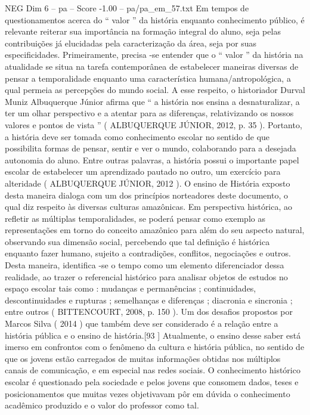 \begin{textsample}{NEG Dim 6 – pa – Score -1.00 – pa/pa\_em\_57.txt}
Em tempos de questionamentos acerca do “ valor ” da história enquanto conhecimento público, é relevante reiterar sua importância na formação integral do aluno, seja pelas contribuições já elucidadas pela caracterização da área, seja por suas especificidades.
Primeiramente, precisa -se entender que o “ valor ” da história na atualidade se situa na tarefa contemporânea de estabelecer maneiras diversas de pensar a temporalidade enquanto uma característica humana/antropológica, a qual permeia as percepções do mundo social.
A esse respeito, o historiador Durval Muniz Albuquerque Júnior afirma que “ a história nos ensina a desnaturalizar, a ter um olhar perspectivo e a atentar para as diferenças, relativizando os nossos valores e pontos de vista ” ( ALBUQUERQUE JÚNIOR, 2012, p. 35 ).
Portanto, a história deve ser tomada como conhecimento escolar no sentido de que possibilita formas de pensar, sentir e ver o mundo, colaborando para a desejada autonomia do aluno.
Entre outras palavras, a história possui o importante papel escolar de estabelecer um aprendizado pautado no outro, um exercício para alteridade ( ALBUQUERQUE JÚNIOR, 2012 ).
O ensino de História exposto desta maneira dialoga com um dos princípios norteadores deste documento, o qual diz respeito às diversas culturas amazônicas.
Em perspectiva histórica, ao refletir as múltiplas temporalidades, se poderá pensar como exemplo as representações em torno do conceito amazônico para além do seu aspecto natural, observando sua dimensão social, percebendo que tal definição é histórica enquanto fazer humano, sujeito a contradições, conflitos, negociações e outros.
Desta maneira, identifica -se o tempo como um elemento diferenciador dessa realidade, ao trazer o referencial histórico para analisar objetos de estudos no espaço escolar tais como : mudanças e permanências ; continuidades, descontinuidades e rupturas ; semelhanças e diferenças ; diacronia e sincronia ; entre outros ( BITTENCOURT, 2008, p. 150 ).
Um dos desafios propostos por Marcos Silva ( 2014 ) que também deve ser considerado é a relação entre a história pública e o ensino de história.[93 ] Atualmente, o ensino desse saber está imerso em confrontos com o fenômeno da cultura e história pública, no sentido de que os jovens estão carregados de muitas informações obtidas nos múltiplos canais de comunicação, e em especial nas redes sociais.
O conhecimento histórico escolar é questionado pela sociedade e pelos jovens que consomem dados, teses e posicionamentos que muitas vezes objetivavam pôr em dúvida o conhecimento acadêmico produzido e o valor do professor como tal.

\end{textsample}
